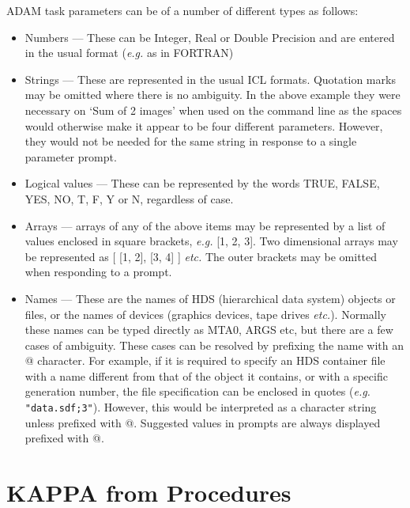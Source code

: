 \documentclass[twoside,11pt,nolof,chapters]{starlink}
\begin{document}
ADAM task parameters can be of a number of different types as follows:

\begin{itemize}

\item Numbers --- These can be Integer, Real or Double Precision and are
entered in the usual format (\emph{e.g.} as in FORTRAN)

\item Strings --- These are represented in the usual ICL formats. Quotation
marks may be omitted where there is no ambiguity. In the above example they
were necessary on `Sum of 2 images' when used on the command line as the spaces
would otherwise make it appear to be four different parameters. However, they
would not be needed for the same string in response to a single parameter
prompt.

\item Logical values --- These can be represented by the words TRUE, FALSE,
YES, NO, T, F, Y or N, regardless of case.

\item Arrays --- arrays of any of the above items may be represented by
a list of values enclosed in square brackets, \emph{e.g.} [1, 2, 3].
Two dimensional arrays may be represented as [ [1, 2], [3, 4] ] \emph{etc.}
The outer brackets may be omitted when responding to a prompt.

\item Names --- These are the names of HDS (hierarchical data system) objects
or files, or the names of devices (graphics devices, tape drives \emph{etc.}).
Normally these names can be typed directly as MTA0, ARGS etc, but there
are a few cases of ambiguity.
These cases can be resolved by prefixing the name with an @ character.
For example, if it is required to specify an HDS container file with a name
different from that of the object it contains, or with a specific generation
number, the file specification can be enclosed in quotes
(\emph{e.g.} \verb+"data.sdf;3"+).
However, this would be interpreted as a character string unless prefixed with
@.
Suggested values in prompts are always displayed prefixed with @.

\end{itemize}

\section{KAPPA from Procedures}
\end{document}
